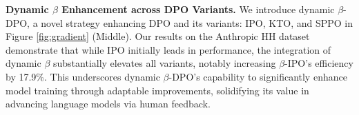 \textbf{Dynamic $\beta$ Enhancement across DPO Variants.}
We introduce dynamic $\beta$-DPO, a novel strategy enhancing DPO and its variants: IPO, KTO, and SPPO in Figure \ref{fig:gradient} (Middle). Our results on the Anthropic HH dataset demonstrate that while IPO initially leads in performance, the integration of dynamic $\beta$ substantially elevates all variants, notably increasing $\beta$-IPO's efficiency by 17.9\%. This underscores dynamic $\beta$-DPO's capability to significantly enhance model training through adaptable improvements, solidifying its value in advancing language models via human feedback.

